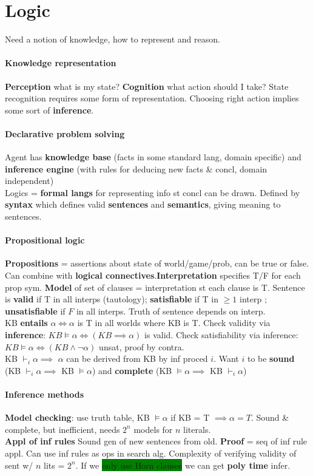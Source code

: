 \section{Logic} Need a notion of knowledge, how to represent and
reason.
\paragraph{Knowledge representation} \textbf{Perception} what is my
state? \textbf{Cognition} what action should I take? State recognition
requires some form of representation. Choosing right action implies
some sort of \textbf{inference}.
\paragraph{Declarative problem solving} Agent has \textbf{knowledge
  base} (facts in some standard lang, domain specific) and \textbf{inference engine}
(with rules for deducing new facts \& concl, domain independent)
\\ Logics = \textbf{formal langs} for representing info st concl can
be drawn. Defined by \textbf{syntax} which defines valid
\textbf{sentences} and \textbf{semantics}, giving meaning to
sentences.
\paragraph{Propositional logic} \textbf{Propositions} = assertions
about state of world/game/prob, can be true or false. Can combine with
\textbf{logical connectives}.\textbf{Interpretation} specifies T/F for
each prop sym. \textbf{Model} of set of clauses = interpretation st
each clause is T. Sentence is \textbf{valid} if T in all interps
(tautology); \textbf{satisfiable} if T in $\geq 1$ interp ;
\textbf{unsatisfiable} if $F$ in all interps. Truth of sentence
depends on interp.
\\ KB \textbf{entails} $\alpha \iff \alpha$ is T in all worlds where
KB is T. Check validity via \textbf{inference}: $KB \models \alpha
\iff (KB \implies \alpha)$ is valid. Check satisfiability via
inference: $KB \models \alpha \iff (KB \land \neg \alpha)$ unsat,
proof by contra.
\\ KB $\vdash_i\alpha \implies$ $\alpha$ can be derived from KB by inf
proced $i$. Want $i$ to be \textbf{sound} (KB $\vdash_i \alpha
\implies $ KB $\models \alpha$) and \textbf{complete} (KB $\models
\alpha \implies$ KB $\vdash_i \alpha$)
\paragraph{Inference methods}
\textbf{Model checking}: use truth table, KB $\models \alpha$ if
KB = T $\implies \alpha = T$. Sound \& complete, but inefficient,
needs $2^n$ models for $n$ literals.
\\ \textbf{Appl of inf rules} Sound gen of new sentences from
old. \textbf{Proof} = seq of inf rule appl. Can use inf rules as ops
in search alg. Complexity of verifying validity of sent w/ $n$ lits =
$2^n$. If we \colorbox{green}{only use Horn clauses} we can get \textbf{poly time} infer.
